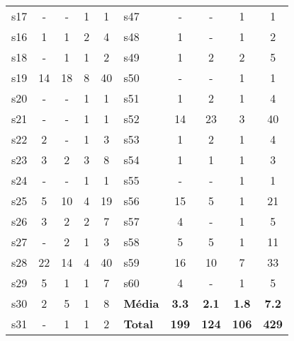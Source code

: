 \begin{longtable}{ l c c c c | l c c c c }
s17 & - & - & 1 & 1 & s47 & - & - & 1 & 1 \\
s16 & 1 & 1 & 2 & 4 & s48 & 1 & - & 1 & 2 \\
s18 & - & 1 & 1 & 2 & s49 & 1 & 2 & 2 & 5 \\
s19 & 14 & 18 & 8 & 40 & s50 & - & - & 1 & 1 \\
s20 & - & - & 1 & 1 & s51 & 1 & 2 & 1 & 4 \\
s21 & - & - & 1 & 1 & s52 & 14 & 23 & 3 & 40 \\
s22 & 2 & - & 1 & 3 & s53 & 1 & 2 & 1 & 4 \\
s23 & 3 & 2 & 3 & 8 & s54 & 1 & 1 & 1 & 3 \\
s24 & - & - & 1 & 1 & s55 & - & - & 1 & 1 \\
s25 & 5 & 10 & 4 & 19 & s56 & 15 & 5 & 1 & 21 \\
s26 & 3 & 2 & 2 & 7 & s57 & 4 & - & 1 & 5 \\
s27 & - & 2 & 1 & 3 & s58 & 5 & 5 & 1 & 11 \\
s28 & 22 & 14 & 4 & 40 & s59 & 16 & 10 & 7 & 33 \\
s29 & 5 & 1 & 1 & 7 & s60 & 4 & - & 1 & 5 \\
s30 & 2 & 5 & 1 & 8 & {\bf Média} & {\bf 3.3} & {\bf 2.1} & {\bf 1.8} & {\bf 7.2} \\
s31 & - & 1 & 1 & 2 & {\bf Total} & {\bf 199} & {\bf 124} & {\bf 106} & {\bf 429} \\
\end{longtable}

